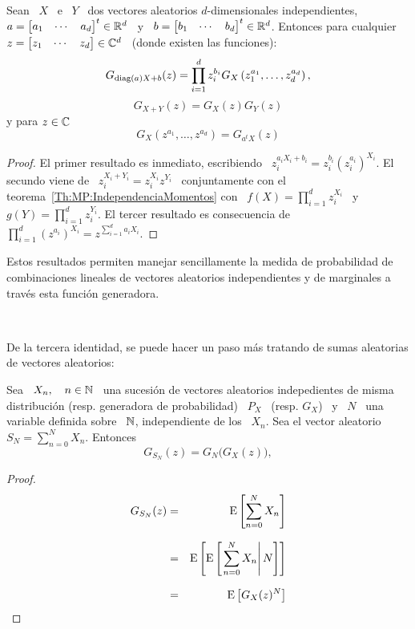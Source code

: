 \begin{teorema}%
\label{Th:MP:PropiedadesGeneradoraProbabilidad}
Sean \ $X$ \ e \ $Y$ \ dos vectores aleatorios $d$-dimensionales independientes,
$a = \begin{bmatrix}  a_1 & \cdots &  a_d \end{bmatrix}^t \in \mathbb{R}^d$ \  y \ $b
= \begin{bmatrix} b_1 & \cdots & b_d \end{bmatrix}^t \in \mathbb{R}^d$. Entonces para
cualquier $z  = \begin{bmatrix} z_1 &  \cdots & z_d  \end{bmatrix}\in \mathbb{C}^d$ \
(donde existen las funciones):
  \[
  G_{\operatorname{diag}(a) X + b}(z) =  \prod_{i=1}^d z_i^{b_i} G_X\left( z_1^{a_1} , \ldots ,
    z_d^{a_d} \right),
  \]
  \[
  G_{X+Y}(z) = G_X(z) G_Y(z)
  \]
  y para $z \in \mathbb{C}$
  \[
  G_X\left( z^{a_1} , \ldots , z^{a_d} \right) = G_{a^t X}(z)
  \]
\end{teorema}
%
\begin{proof}
  El  primer  resultado es  inmediato,  escribiendo \  $z_i^{a_i  X_i  + b_i}  =
  z_i^{b_i}   \left(  z_i^{a_i}   \right)^{X_i}$.    El  secundo   viene  de   \
  $z_i^{X_i+Y_i}    =    z_i^{X_i}    z^{Y_i}$    \   conjuntamente    con    el
  teorema~\ref{Th:MP:IndependenciaMomentos}   con   \   $f(X)  =   \prod_{i=1}^d
  z_i^{X_i}$  \ y \  $g(Y) =  \prod_{i=1}^d z_i^{Y_i}$.  El tercer  resultado es
  consecuencia de $\prod_{i=1}^d  \left( z^{a_i} \right)^{X_i} = z^{\sum_{i=1}^d
    a_i X_i}$.
\end{proof}
%
Estos  resultados permiten manejar  sencillamente la  medida de  probabilidad de
combinaciones lineales  de vectores aleatorios independientes y  de marginales a
trav\'es esta funci\'on generadora.

\

De  la  tercera identidad,  se  puede  hacer un  paso  m\'as  tratando de  sumas
aleatorias de vectores aleatorios:
%
\begin{teorema}\label{Th:MP:SumaAleatoriaGeneradoraProbabilidad}
  Sea  \ $X_n,  \quad n  \in  \mathbb{N}$ \,  una sucesi\'on  de vectores  aleatorios
  indepedientes de  misma distribuci\'on  (resp.  generadora de  probabilidad) \
  $P_X$ \  (resp. $G_X$)  \ y  \ $N$ \  una variable  definida sobre  \ $\mathbb{N}$,
  independiente de los  \ $X_n$. Sea el vector aleatorio \  $ S_N = \sum_{n=0}^N
  X_n$. Entonces
  \[
  G_{S_N}(z) =  G_N \big( G_X(z) \big),
  \]
\end{teorema}
%
\begin{proof}
  \begin{eqnarray*}
  G_{S_N}(z) & = & \operatorname{E}\left[ \sum_{n=0}^N X_n \right]\\[2.5mm]
  & = & \operatorname{E}\left[ \operatorname{E}\left[ \left. \sum_{n=0}^N X_n \right| N  \right] \right]\\[2.5mm]
  & = & \operatorname{E}\left[ G_X(z)^N \right]
  \end{eqnarray*}
\end{proof}


